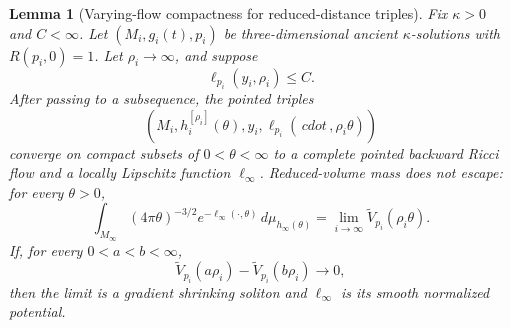 \documentclass[10pt]{coll-l}
\newtheorem{lemma}[theorem]{Lemma}
\theoremstyle{definition}
\theoremstyle{remark}
\numberwithin{section}{chapter}
\numberwithin{equation}{chapter}
\begin{document}
\begin{lemma}[Varying-flow compactness for reduced-distance triples]
\label{lem:ncs-varying-ell-compactness}
Fix $\kappa>0$ and $C<\infty$.  Let
$(M_i,g_i(t),p_i)$ be three-dimensional ancient $\kappa$-solutions with
$R(p_i,0)=1$.  Let $\rho_i\to\infty$, and suppose
\begin{equation}
                         \ell_{p_i}(y_i,\rho_i)\leq C.  \label{eq:ncs-moving-center-ell-bound}
\end{equation}
After passing to a subsequence, the pointed triples
\begin{equation}
 \left(M_i,h_i^{[\rho_i]}(\theta),y_i,
       \ell_{p_i}(\,cdot\,,\rho_i\theta)\right)       \label{eq:ncs-rescaled-ell-triples}
\end{equation}
converge on compact subsets of $0<\theta<\infty$ to a complete pointed
backward Ricci flow and a locally Lipschitz function $\ell_\infty$.
Reduced-volume mass does not escape: for every $\theta>0$,
\begin{equation}
 \int_{M_\infty}(4\pi\theta)^{-3/2}e^{-\ell_\infty(\cdot,\theta)}
                 \,d\mu_{h_\infty(\theta)}
       =\lim_{i\to\infty}\widetilde V_{p_i}(\rho_i\theta).   \label{eq:ncs-varying-no-loss-identity}
\end{equation}
If, for every $0<a<b<\infty$,
\begin{equation}
 \widetilde V_{p_i}(a\rho_i)-\widetilde V_{p_i}(b\rho_i)
                         \longrightarrow0,             \label{eq:ncs-varying-zero-drop}
\end{equation}
then the limit is a gradient shrinking soliton and $\ell_\infty$ is its
smooth normalized potential.
\end{lemma}
\end{document}
